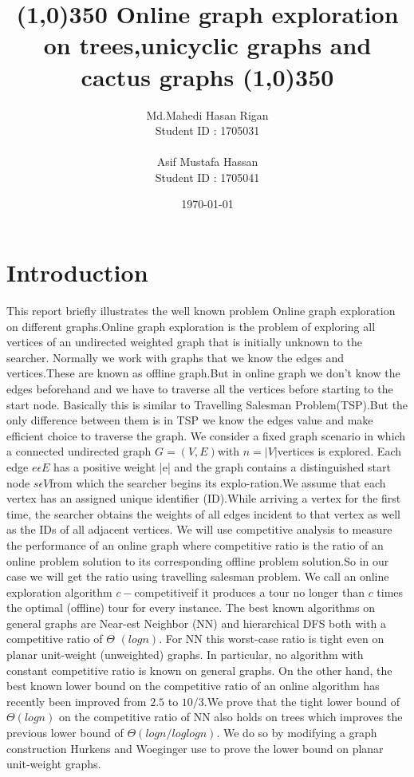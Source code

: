 \documentclass{report}
\title{
    \line(1,0){350}
    \endgraf\bigskip
    \LARGE\textbf
    {Online graph exploration on trees,unicyclic graphs and cactus graphs}
    \newline
    \line(1,0){350}
    \bigskip
    \bigskip
    }
\author{
    \Large{Md.Mahedi Hasan Rigan}\\
    \Large{Student ID : 1705031}\\\\
    \Large{Asif Mustafa Hassan}\\
    \Large{Student ID : 1705041}
    }
\date{
    \endgraf\bigskip
    \Large{\today}
    }
\begin{document}
\maketitle

\renewcommand{\familydefault}{\sfdefault}
\tableofcontents{}
\chapter{Introduction}
    This report briefly illustrates the well known problem Online graph exploration on different graphs.Online graph exploration is the problem of exploring all vertices of an undirected weighted graph that is initially unknown to the searcher.
    \newline
    \newline
    Normally we work with graphs that we know the edges and vertices.These are known as offline graph.But in online graph we don't know the edges beforehand and we have to traverse all the vertices before starting to the start node. Basically this is similar to Travelling Salesman Problem(TSP).But the only difference between them is in TSP we know the edges value and make efficient choice to traverse the graph.
    \newline
    \newline
    We consider a fixed graph scenario in which a connected undirected graph $G =(V, E)$with $n =|V|$vertices is explored. Each edge $e  \epsilon  E$ has a positive weight |e| and the graph contains a distinguished start node $s  \epsilon     V$from which the searcher begins its explo-ration.We assume that each vertex has an assigned unique identifier (ID).While arriving a vertex for the first time, the searcher obtains the weights of all edges incident to that vertex as well as the IDs of all adjacent vertices.
    \newline \newline
    We will use competitive analysis to measure the performance of an online graph where competitive ratio is the ratio of an online problem solution to its corresponding offline problem solution.So in our case we will get the ratio using travelling salesman problem. We call an online exploration algorithm $c-$competitiveif it produces a tour no longer than $c$ times the optimal (offline) tour for every instance.
    \newline
    \newline
    The best known algorithms on general graphs are Near-est Neighbor (NN) and hierarchical DFS both with a competitive ratio of $\Theta$ $(logn)$. For NN this worst-case ratio is tight even on planar unit-weight (unweighted) graphs. In particular, no algorithm with constant competitive ratio is known on general graphs. On the other hand, the best known lower bound on the competitive ratio of an online algorithm has recently been improved from $2.5$ to $10/3$.We prove that the tight lower bound of $\Theta (logn)$ on the competitive ratio of NN also holds on trees which improves the previous lower bound of $\Theta(logn/ loglogn)$. We do so by modifying a graph construction Hurkens and Woeginger use to prove the lower bound on planar unit-weight graphs.
    \newline
\end{document}
